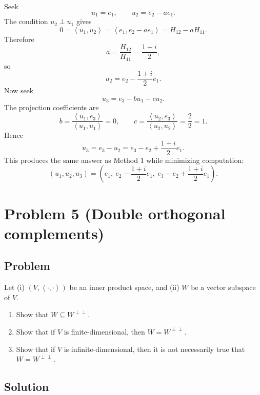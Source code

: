 \documentclass[12pt]{article}
\newcommand{\ip}[2]{\left\langle #1,#2\right\rangle}
\begin{document}
Seek
\[
u_1=e_1,
\qquad
u_2=e_2-ae_1.
\]
The condition $u_2\perp u_1$ gives
\[
0=\ip{u_1}{u_2}=\ip{e_1}{e_2-ae_1}
=H_{12}-aH_{11}.
\]
Therefore
\[
a=\frac{H_{12}}{H_{11}}=\frac{1+i}{2},
\]
so
\[
u_2=e_2-\frac{1+i}{2}e_1.
\]
Now seek
\[
u_3=e_3-bu_1-cu_2.
\]
The projection coefficients are
\[
b=\frac{\ip{u_1}{e_3}}{\ip{u_1}{u_1}}=0,
\qquad
c=\frac{\ip{u_2}{e_3}}{\ip{u_2}{u_2}}=\frac{2}{2}=1.
\]
Hence
\[
u_3=e_3-u_2=e_3-e_2+\frac{1+i}{2}e_1.
\]
This produces the same answer as Method 1 while minimizing computation:
\[
\boxed{\,
(u_1,u_2,u_3)=\left(e_1,\ e_2-\frac{1+i}{2}e_1,\ e_3-e_2+\frac{1+i}{2}e_1\right).
\,}
\]


\newpage
\section{Problem 5 (Double orthogonal complements)}
\subsection{Problem}
Let (i) $(V,\ip{\cdot}{\cdot})$ be an inner product space, and (ii) $W$ be a vector subspace of $V$.
\begin{enumerate}[label=(\alph*)]
\item Show that $W\subseteq W^{\perp\perp}$.
\item Show that if $V$ is finite-dimensional, then $W=W^{\perp\perp}$.
\item Show that if $V$ is infinite-dimensional, then it is not necessarily true that $W=W^{\perp\perp}$.
\end{enumerate}

\subsection{Solution}
\end{document}
